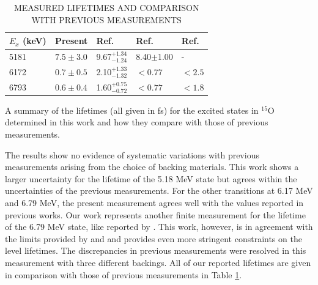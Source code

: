 \begin{table}[]
\caption{MEASURED LIFETIMES AND COMPARISON WITH PREVIOUS MEASUREMENTS}
\begin{center}
\begin{threeparttable}
\begin{tabular}{lllll}
\toprule
$E_{x}$ (keV) & Present       & Ref. \cite{Bertone2001}  & Ref. \cite{Schurmann2008} & Ref. \cite{Galinski2014} \\
\midrule
5181          & $7.5 \pm 3.0$ & 9.67$^{+1.34}_{-1.24}$ & 8.40$\pm$1.00            & -                       \\
6172          & $0.7 \pm 0.5$ & 2.10$^{+1.33}_{-1.32}$  & $< 0.77$                 & $< 2.5$                 \\
6793          & $0.6 \pm 0.4$ & 1.60$^{+0.75}_{-0.72}$  & $< 0.77$                 & $< 1.8$    \\ \bottomrule
\end{tabular}
\begin{tablenotes}
\small 
\item A summary of the lifetimes (all given in fs) for the excited states in $^{15}$O determined in this work and how they compare with those of previous measurements. 
\end{tablenotes}
\end{threeparttable}
\label{table: lifetimesSummary}
\end{center}
\end{table}

The results show no evidence of systematic variations with previous measurements arising from the choice of backing materials. This work shows a larger uncertainty for the lifetime of the 5.18 MeV state but agrees within the uncertainties of the previous measurements. For the other transitions at 6.17 MeV and 6.79 MeV, the present measurement agrees well with the values reported in previous works. Our work represents another finite measurement for the lifetime of the 6.79 MeV state, like reported by \citet{Bertone2001}. This work, however, is in agreement with the limits provided by \citet{Schurmann2008} and \citet{Galinski2014} and provides even more stringent constraints on the level lifetimes. The discrepancies in previous measurements were resolved in this measurement with three different backings. All of our reported lifetimes are given in comparison with those of previous measurements in Table \ref{table: lifetimesSummary}.



%
% 
% 
